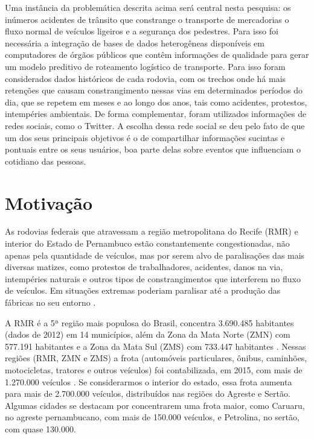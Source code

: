 Uma instância da problemática descrita acima será central nesta pesquisa: os inúmeros acidentes de trânsito que constrange o transporte de mercadorias o fluxo normal de veículos ligeiros e a segurança dos pedestres. Para isso foi necessária a integração de bases de dados heterogêneas disponíveis em computadores de órgãos públicos que contêm informações de qualidade para gerar um modelo preditivo de roteamento logístico de transporte. Para isso foram considerados dados históricos de cada rodovia, com os trechos onde há mais 
retenções que causam constrangimento nessas vias em determinados períodos do dia, que se repetem em meses e ao longo dos anos, tais como acidentes, protestos, intempéries ambientais.
De forma complementar, foram utilizados informações de redes sociais, como o Twitter. A escolha dessa rede social se deu pelo fato de que um dos seus principais objetivos é o de compartilhar informações sucintas e pontuais entre os seus usuários, boa parte delas sobre eventos que influenciam o cotidiano das pessoas.



\section{ Motivação}\label{intro:motivacao}

As rodovias federais que atravessam a região metropolitana do Recife (RMR) e interior do Estado de Pernambuco estão constantemente congestionadas, não apenas pela 
quantidade de veículos, mas por serem alvo de paralisações das mais diversas matizes, como protestos de trabalhadores, acidentes, danos na via, intempéries naturais e outros tipos de constrangimentos que interferem no fluxo de veículos. 
Em situações extremas poderiam paralisar até a produção das fábricas no seu entorno \cite{BNDES2013}. 

A RMR é a 5ª região mais populosa do Brasil, concentra 3.690.485 habitantes (dados de 2012) em 14 municípios, além da 
Zona da Mata Norte (ZMN) com 577.191 habitantes e a Zona da Mata Sul (ZMS) com 733.447 habitantes \cite{Bitoun2012}. 
Nessas regiões (RMR, ZMN e ZMS) a frota (automóveis particulares, ônibus, caminhões, motocicletas, tratores e outros veículos) 
foi contabilizada, em 2015, com mais de 1.270.000 veículos \cite{FrotaVeiculosIBGE}. Se considerarmos o interior do estado, essa frota aumenta para mais de 2.700.000 veículos, distribuídos nas regiões do Agreste e Sertão. Algumas cidades se destacam por concentrarem uma frota maior, como Caruaru, no agreste pernambucano, com mais de 150.000 veículos, e Petrolina, no sertão, com quase 130.000. 
																			

